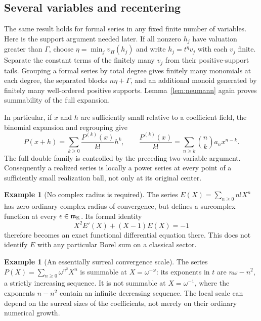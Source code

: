 \documentclass[11pt,a4paper]{article}
\theoremstyle{definition}\newtheorem{definition}[theorem]{Definition}
\newtheorem{example}[theorem]{Example}
\theoremstyle{remark}\newtheorem{remark}[theorem]{Remark}
\newcommand{\vH}{v_H}
\numberwithin{equation}{section}
\begin{document}
\subsection{Several variables and recentering}
The same result holds for formal series in any fixed finite number of variables. Here is the support argument needed later. If all nonzero $h_j$ have valuation greater than $\Gamma$, choose $\eta=\min_j\vH(h_j)$ and write $h_j=t^\eta v_j$ with each $v_j$ finite. Separate the constant terms of the finitely many $v_j$ from their positive-support tails. Grouping a formal series by total degree gives finitely many monomials at each degree, the separated blocks $n\eta+\Gamma$, and an additional monoid generated by finitely many well-ordered positive supports. Lemma~\ref{lem:neumann} again proves summability of the full expansion.

In particular, if $x$ and $h$ are sufficiently small relative to a coefficient field, the binomial expansion and regrouping give
\begin{equation}\label{eq:recenter}
 P(x+h)=\sum_{k\geq0}\frac{P^{(k)}(x)}{k!}h^k,
 \qquad
 \frac{P^{(k)}(x)}{k!}
 =\sum_{n\geq k}\binom nk a_nx^{n-k}.
\end{equation}
The full double family is controlled by the preceding two-variable argument. Consequently a realized series is locally a power series at every point of a sufficiently small realization ball, not only at its original center.

\begin{example}[No complex radius is required]\label{ex:euler}
The series $E(X)=\sum_{n\geq0}n!X^n$ has zero ordinary complex radius of convergence, but defines a surcomplex function at every $\epsilon\in\mathfrak m_{\mathbb K}$. Its formal identity
\[
 X^2E'(X)+(X-1)E(X)=-1
\]
therefore becomes an exact functional differential equation there. This does not identify $E$ with any particular Borel sum on a classical sector.
\end{example}

\begin{example}[An essentially surreal convergence scale]
The series $P(X)=\sum_{n\geq0}\omega^{n^2}X^n$ is summable at $X=\omega^{-\omega}$: its exponents in $t$ are $n\omega-n^2$, a strictly increasing sequence. It is not summable at $X=\omega^{-1}$, where the exponents $n-n^2$ contain an infinite decreasing sequence. The local scale can depend on the surreal sizes of the coefficients, not merely on their ordinary numerical growth.
\end{example}
\end{document}
